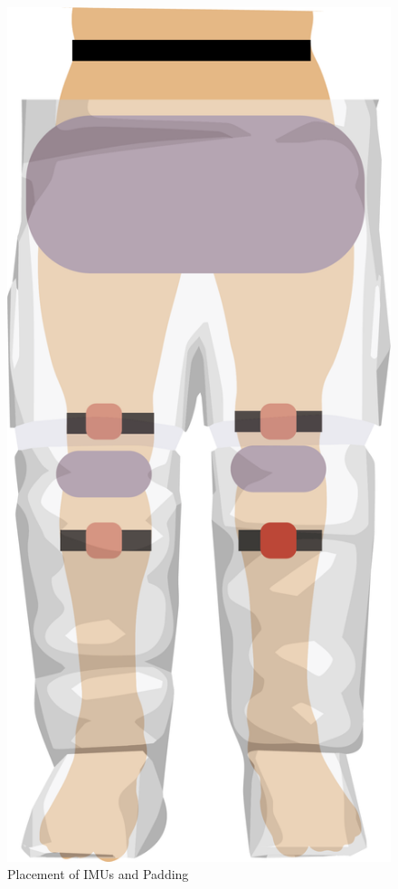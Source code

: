\documentclass[defaultstyle,11pt]{comps}
\begin{document}
\begin{figure}
\hypertarget{fig:SA1-Loc}{%
\centering
\includegraphics{../fig/SA1/IMUPlacement.png}
\caption{Placement of IMUs and Padding}\label{fig:SA1-Loc}
}
\end{figure}
\end{document}
